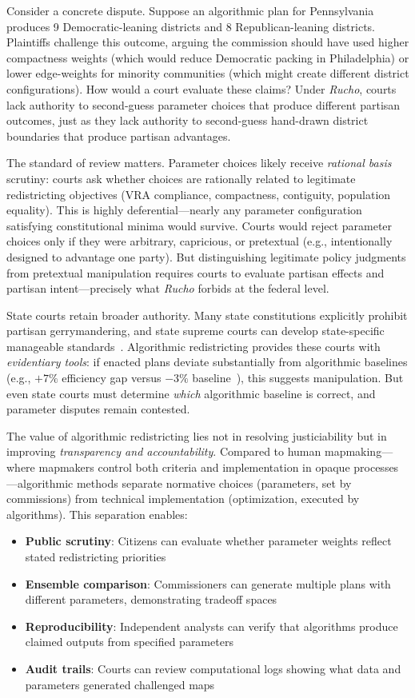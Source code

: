 Consider a concrete dispute. Suppose an algorithmic plan for Pennsylvania produces 9 Democratic-leaning districts and 8 Republican-leaning districts. Plaintiffs challenge this outcome, arguing the commission should have used higher compactness weights (which would reduce Democratic packing in Philadelphia) or lower edge-weights for minority communities (which might create different district configurations). How would a court evaluate these claims? Under \emph{Rucho}, courts lack authority to second-guess parameter choices that produce different partisan outcomes, just as they lack authority to second-guess hand-drawn district boundaries that produce partisan advantages.

The standard of review matters. Parameter choices likely receive \emph{rational basis} scrutiny: courts ask whether choices are rationally related to legitimate redistricting objectives (VRA compliance, compactness, contiguity, population equality). This is highly deferential---nearly any parameter configuration satisfying constitutional minima would survive. Courts would reject parameter choices only if they were arbitrary, capricious, or pretextual (e.g., intentionally designed to advantage one party). But distinguishing legitimate policy judgments from pretextual manipulation requires courts to evaluate partisan effects and partisan intent---precisely what \emph{Rucho} forbids at the federal level.

State courts retain broader authority. Many state constitutions explicitly prohibit partisan gerrymandering, and state supreme courts can develop state-specific manageable standards~\cite{rucho2019}. Algorithmic redistricting provides these courts with \emph{evidentiary tools}: if enacted plans deviate substantially from algorithmic baselines (e.g., $+7\%$ efficiency gap versus $-3\%$ baseline~\cite{deluca2026efficiency}), this suggests manipulation. But even state courts must determine \emph{which} algorithmic baseline is correct, and parameter disputes remain contested.

The value of algorithmic redistricting lies not in resolving justiciability but in improving \emph{transparency and accountability}. Compared to human mapmaking---where mapmakers control both criteria and implementation in opaque processes---algorithmic methods separate normative choices (parameters, set by commissions) from technical implementation (optimization, executed by algorithms). This separation enables:

\begin{itemize}
\item \textbf{Public scrutiny}: Citizens can evaluate whether parameter weights reflect stated redistricting priorities
\item \textbf{Ensemble comparison}: Commissioners can generate multiple plans with different parameters, demonstrating tradeoff spaces
\item \textbf{Reproducibility}: Independent analysts can verify that algorithms produce claimed outputs from specified parameters
\item \textbf{Audit trails}: Courts can review computational logs showing what data and parameters generated challenged maps
\end{itemize}

